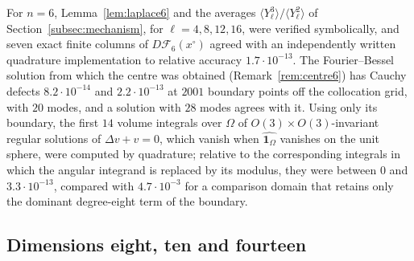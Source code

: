 \documentclass[11pt]{amsart}
\theoremstyle{definition}
\theoremstyle{remark}
\numberwithin{equation}{section}
\newcommand{\Fc}{\mathcal{F}}
\newcommand{\one}{\mathbf{1}}
\begin{document}
For $n=6$, Lemma~\ref{lem:laplace6} and the averages $\langle Y_\ell^3\rangle/\langle Y_\ell^2\rangle$ of Section~\ref{subsec:mechanism}, for $\ell=4,8,12,16$, were verified symbolically, and seven exact finite columns of $D\Fc_6(x^\circ)$ agreed with an independently written quadrature implementation to relative accuracy $1.7\cdot10^{-13}$. The Fourier--Bessel solution from which the centre was obtained (Remark~\ref{rem:centre6}) has Cauchy defects $8.2\cdot10^{-14}$ and $2.2\cdot10^{-13}$ at $2001$ boundary points off the collocation grid, with $20$ modes, and a solution with $28$ modes agrees with it. Using only its boundary, the first $14$ volume integrals over $\Omega$ of $O(3)\times O(3)$-invariant regular solutions of $\Delta v+v=0$, which vanish when $\widehat{\one_\Omega}$ vanishes on the unit sphere, were computed by quadrature; relative to the corresponding integrals in which the angular integrand is replaced by its modulus, they were between $0$ and $3.3\cdot10^{-13}$, compared with $4.7\cdot10^{-3}$ for a comparison domain that retains only the dominant degree-eight term of the boundary.

\subsection{Dimensions eight, ten and fourteen}\label{lie:subsec:cap}
\end{document}
